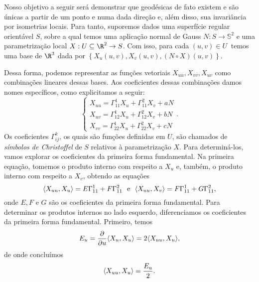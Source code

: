 Nosso objetivo a seguir será demonstrar que geodésicas de fato existem e são únicas a partir de um ponto e numa dada direção e, além disso, sua invariância por isometrias locais.
Para tanto, suporemos dados uma superfície regular orientável \( S \), sobre a qual temos uma aplicação normal de Gauss \( N : S \to \mathbb{S}^{ 2 } \) e uma parametrização local \( X : U \subseteq \R^{ 2 } \to S \).
Com isso, para cada \( ( u, v ) \in U \ \) temos uma base de \( \R^{ 3 } \) dada por \( \left\{ X_{ u } ( u, v ), X_{ v } ( u, v ), ( N \circ X ) ( u, v ) \right\} \).

Dessa forma, podemos representar as funções vetoriais \( X_{ uu }, X_{ vv }, X_{ uv } \) como combinações lineares dessas bases.
Aos coeficientes dessas combinações damos nomes específicos, como explicitamos a seguir:
\begin{equation}
    \begin{cases}
        X_{ uu } = \Gamma_{ 11 }^{ 1 } X_{ u } + \Gamma_{ 11 }^{ 2 } X_{ v } + aN \\
        X_{ uv } = \Gamma_{ 12 }^{ 1 } X_{ u } + \Gamma_{ 12 }^{ 2 } X_{ v } + bN \\
        X_{ vv } = \Gamma_{ 22 }^{ 1 } X_{ u } + \Gamma_{ 22 }^{ 2 } X_{ v } + cN
    \end{cases}
    \label{christoffel}
.\end{equation}
Os coeficientes \( \Gamma_{ ij }^{ k } \), os quais são funções definidas em \( U \), são chamados de \emph{símbolos de Christoffel} de \( S \) relativos à parametrização \( X \).
Para determiná-los, vamos explorar os coeficientes da primeira forma fundamental.
Na primeira equação, tomemos o produto interno com respeito a \( X_{ u } \) e, também, o produto interno com respeito a \( X_{ v } \), obtendo as equações
\begin{equation*}
    \langle X_{ uu }, X_{ u } \rangle = E \Gamma_{ 11 }^{ 1 } + F \Gamma_{ 11 }^{ 2 }     \ \text{ e } \
    \langle X_{ uu }, X_{ v } \rangle = F \Gamma_{ 11 }^{ 1 } + G \Gamma_{ 11 }^{ 2 } ,\end{equation*}
onde \( E, F \) e \( G \) são os coeficientes da primeira forma fundamental.
Para determinar os produtos internos no lado esquerdo, diferenciamos os coeficientes da primeira forma fundamental.
Primeiro, temos
\begin{equation*}
    E_{ u }
    = \frac{ \partial }{ \partial u } \langle X_{ u }, X_{ u } \rangle
    = 2 \langle X_{ uu }, X_{ u } \rangle
,\end{equation*}
de onde concluímos
\begin{equation*}
    \langle X_{ uu }, X_{ u } \rangle = \frac{ E_{ u } }{ 2 }
.\end{equation*}
